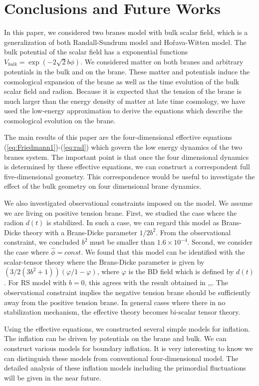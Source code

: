 \documentclass[a4paper,11pt]{article}
\begin{document}
\section{Conclusions and Future Works}

In this paper, we considered two branes model with bulk scalar 
field, which is a generalization of both Randall-Sundrum model and 
Ho\v{r}ava-Witten model. The bulk potential of the scalar field
has a exponential functions $V_{bulk}=\exp(-2 \sqrt{2} b \phi)$.
We considered matter on both 
branes and arbitrary potentials in the bulk and on the brane. These matter and 
potentials induce the cosmological expansion of the brane as well as the 
time evolution of the bulk scalar field and radion.
Because it is expected that the tension of the brane is much larger than 
the energy density of matter at late time cosmology, 
we have used the low-energy approximation to derive the equations 
which describe the cosmological evolution on the brane. 

The main results of this paper are the four-dimensional 
effective equations (\ref{eq:Friedmann1})-(\ref{eq:rad})
which govern the low energy dynamics of the 
two branes system. The important point is that once the 
four dimensional dynamics is determined by these effective equations, 
we can construct a correspondent full five-dimensional geometry. 
This correspondence would be useful to investigate the effect of the bulk geometry 
on four dimensional brane dynamics.

We also investigated observational constraints imposed on the model.
We assume we are living on positive tension brane.
First, we studied the case where 
the radion $d(t)$ is stabilized. In such a case, we can regard this model 
as Brans-Dicke theory with a Brans-Dicke parameter $1/2b^2$. 
From the observational  constraint, we concluded $b^2$ must be smaller than 
$1.6 \times 10^{-4}$. 
Second, we consider the case where $\hat{\phi}=const.$ We found that this model 
can be identified with the scalar-tensor theory where the Brans-Dicke 
parameter is given by $(3/2(3b^2+1)) (\varphi/1-\varphi)$, where $\varphi$
is the BD field which is defined by $d(t)$. For RS model with $b=0$, 
this agrees with the result obtained in 
\cite{Kanno1},\cite{Kanno2},\cite{GT}. 
The observational constraint implies the negative tension brane should be 
sufficiently away from the positive tension brane. In general cases
where there in no stabilization mechanism, the effective theory becomes 
bi-scalar tensor theory. 

Using the effective equations, we constructed several
simple models for inflation. The inflation can be driven by  
potentials on the brane and bulk. We can construct various 
models for boundary inflation. It is very interesting to know 
we can distinguish these models from conventional
four-dimensional model. The detailed analysis of these
inflation models including the primordial fluctuations 
will be given in the near future. 
\end{document}
